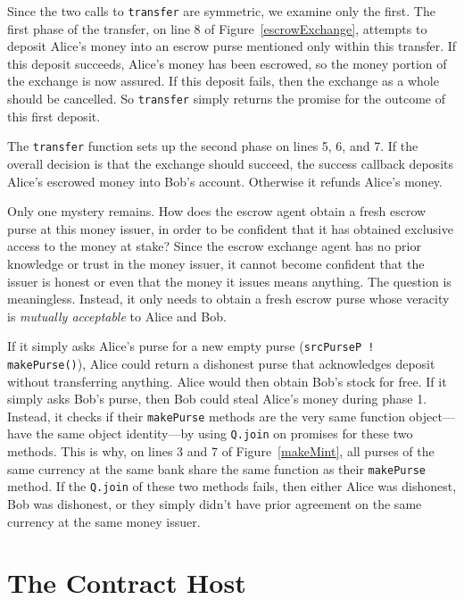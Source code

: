 \documentclass{llncs}
\begin{document}
Since the two calls to {\tt transfer} are symmetric, we examine only the first. The first phase of the transfer, on line 8 of Figure~\ref{escrowExchange}, attempts to deposit Alice's money into an escrow purse mentioned only within this transfer. If this deposit succeeds, Alice's money has been escrowed, so the money portion of the exchange is now assured. If this deposit fails, then the exchange as a whole should be cancelled. So {\tt transfer} simply returns the promise for the outcome of this first deposit.

The {\tt transfer} function sets up the second phase on lines 5, 6, and 7. If the overall decision is that the exchange should succeed,  the success callback deposits Alice's escrowed money into Bob's account. Otherwise it refunds Alice's money.

Only one mystery remains. How does the escrow agent obtain a fresh escrow purse at this money issuer, in order to be confident that it has obtained exclusive access to the money at stake? Since the escrow exchange agent has no prior knowledge or trust in the money issuer, it cannot become confident that the issuer is honest or even that the money it issues means anything. The question is meaningless. Instead, it only needs to obtain a fresh escrow purse whose veracity is \emph{mutually acceptable} to Alice and Bob.

If it simply asks Alice's purse for a new empty purse ({\tt srcPurseP ! makePurse()}), Alice could return a dishonest purse that acknowledges deposit without transferring anything. Alice would then obtain Bob's stock for free. If it simply asks Bob's purse, then Bob could steal Alice's money during phase 1. Instead, it checks if their {\tt makePurse} methods are the very same function object---have the same object identity---by using {\tt Q.join} on promises for these two methods. This is why, on lines 3 and 7 of Figure~\ref{makeMint}, all purses of the same currency at the same bank share the same function as their {\tt makePurse} method. If the {\tt Q.join} of these two methods fails, then either Alice was dishonest, Bob was dishonest, or they simply didn't have prior agreement on the same currency at the same money issuer.

\section{The Contract Host}
\label{contracthost}
\end{document}
